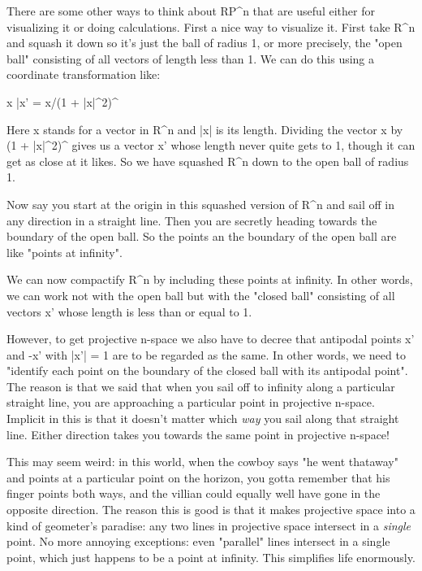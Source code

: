 There are some other ways to think about RP^{n} that are useful either
for visualizing it or doing calculations.  First a nice way to visualize
it.  First take R^{n} and squash it down so it's just the ball of radius 1,
or more precisely, the "open ball" consisting of all vectors of length
less than 1.  We can do this using a coordinate transformation like:

x |\to  x' = x/(1 + |x|^{2})^{ }

Here x stands for a vector in R^{n} and |x| is its length.  Dividing the
vector x by (1 + |x|^{2})^{ } 
gives us a vector x' whose length never
quite gets to 1, though it can get as close at it likes.  So we have
squashed R^{n} down to the open ball of radius 1.  

Now say you start at the origin in this squashed version of R^{n} and 
sail off in any direction in a straight line.  Then you are secretly
heading towards the boundary of the open ball.   So the points an the
boundary of the open ball are like "points at infinity".  

We can now compactify R^{n} by including these points at infinity. In
other words, we can work not with the open ball but with the "closed
ball" consisting of all vectors x' whose length is less than or equal
to 1.

However, to get projective n-space we also have to decree that antipodal
points x' and -x' with |x'| = 1 are to be regarded as the same.   In
other words, we need to "identify each point on the boundary of the
closed ball with its antipodal point".  The reason is that we said that
when you sail off to infinity along a particular straight line, you are
approaching a particular point in projective n-space.  Implicit in this 
is that it doesn't matter which \emph{way} you sail along that straight line.
Either direction takes you towards the same point in projective n-space!

This may seem weird: in this world, when the cowboy says "he went
thataway" and points at a particular point on the horizon, you gotta
remember that his finger points both ways, and the villian could equally
well have gone in the opposite direction.   The reason this is good is
that it makes projective space into a kind of geometer's paradise: any
two lines in projective space intersect in a \emph{single} point.  No more
annoying exceptions: even "parallel" lines intersect in a single point,
which just happens to be a point at infinity.   This simplifies life
enormously.

